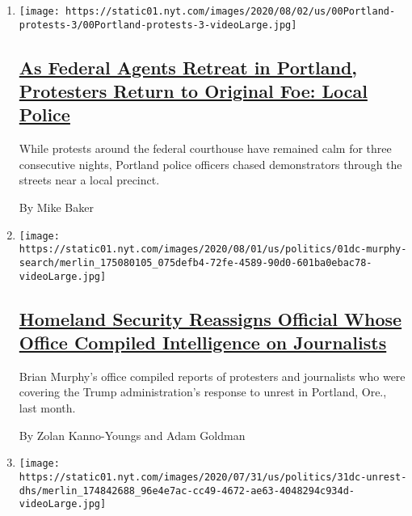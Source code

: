 \begin{enumerate}
\def\labelenumi{\arabic{enumi}.}
\item
  \texttt{[image: https://static01.nyt.com/images/2020/08/02/us/00Portland-protests-3/00Portland-protests-3-videoLarge.jpg]}

  \hypertarget{as-federal-agents-retreat-in-portland-protesters-return-to-original-foe-local-police}{%
  \subsection{\texorpdfstring{\href{/2020/08/02/us/portland-protests-.html}{As
  Federal Agents Retreat in Portland, Protesters Return to Original Foe:
  Local
  Police}}{As Federal Agents Retreat in Portland, Protesters Return to Original Foe: Local Police}}\label{as-federal-agents-retreat-in-portland-protesters-return-to-original-foe-local-police}}

  While protests around the federal courthouse have remained calm for
  three consecutive nights, Portland police officers chased
  demonstrators through the streets near a local precinct.

  By Mike Baker
\item
  \texttt{[image: https://static01.nyt.com/images/2020/08/01/us/politics/01dc-murphy-search/merlin\_175080105\_075defb4-72fe-4589-90d0-601ba0ebac78-videoLarge.jpg]}

  \hypertarget{homeland-security-reassigns-official-whose-office-compiled-intelligence-on-journalists}{%
  \subsection{\texorpdfstring{\href{/2020/08/01/us/politics/brian-murphy-homeland-security-protesters.html}{Homeland
  Security Reassigns Official Whose Office Compiled Intelligence on
  Journalists}}{Homeland Security Reassigns Official Whose Office Compiled Intelligence on Journalists}}\label{homeland-security-reassigns-official-whose-office-compiled-intelligence-on-journalists}}

  Brian Murphy's office compiled reports of protesters and journalists
  who were covering the Trump administration's response to unrest in
  Portland, Ore., last month.

  By Zolan Kanno-Youngs and Adam Goldman
\item
  \texttt{[image: https://static01.nyt.com/images/2020/07/31/us/politics/31dc-unrest-dhs/merlin\_174842688\_96e4e7ac-cc49-4672-ae63-4048294c934d-videoLarge.jpg]}


\end{enumerate}
